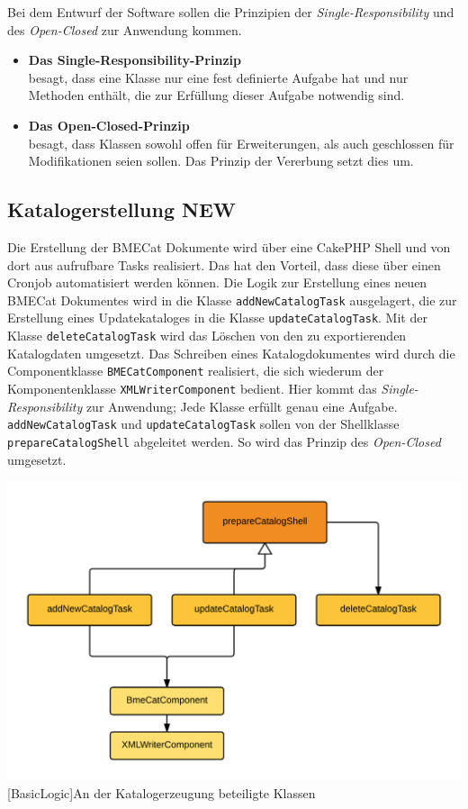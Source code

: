 	Bei dem Entwurf der Software sollen die Prinzipien der \textit{Single-Responsibility} und des \textit{Open-Closed} zur Anwendung kommen.
	
	\begin{itemize}
	\item \textbf{Das Single-Responsibility-Prinzip}\\besagt, dass eine Klasse nur eine fest definierte Aufgabe hat und nur Methoden enthält, die zur Erfüllung dieser Aufgabe notwendig sind.
	\item \textbf{Das Open-Closed-Prinzip}\\ besagt, dass Klassen sowohl offen für Erweiterungen, als auch geschlossen für Modifikationen seien sollen. Das Prinzip der Vererbung setzt dies um.
	\end{itemize}
	
	\subsection{Katalogerstellung NEW}
	
	Die Erstellung der BMECat Dokumente wird über eine CakePHP Shell und von dort aus aufrufbare Tasks realisiert. Das hat den Vorteil, dass diese über einen Cronjob automatisiert werden können.
	Die Logik zur Erstellung eines neuen BMECat Dokumentes wird in die Klasse \texttt{addNewCatalogTask} ausgelagert, die zur Erstellung eines Updatekataloges in die Klasse 
	\texttt{updateCatalogTask}. Mit der Klasse \texttt{deleteCatalogTask} wird das Löschen von den zu exportierenden Katalogdaten umgesetzt. Das Schreiben eines Katalogdokumentes wird durch die Componentklasse \texttt{BMECatComponent} realisiert, die sich wiederum der Komponentenklasse \texttt{XMLWriterComponent} bedient. Hier kommt das \textit{Single-Responsibility} zur Anwendung; Jede Klasse erfüllt genau eine Aufgabe. \texttt{addNewCatalogTask} und \texttt{updateCatalogTask} sollen von der Shellklasse \texttt{prepareCatalogShell} abgeleitet werden. So wird das Prinzip des \textit{Open-Closed} umgesetzt.

	\begin{minipage}{\linewidth}
		\vspace{1em}
		\centering
		\includegraphics[width=0.7 \linewidth]{img/VererbungShellSimple}
		[BasicLogic]{An der Katalogerzeugung beteiligte Klassen}
		\vspace{1em}
	\end{minipage}	
	
